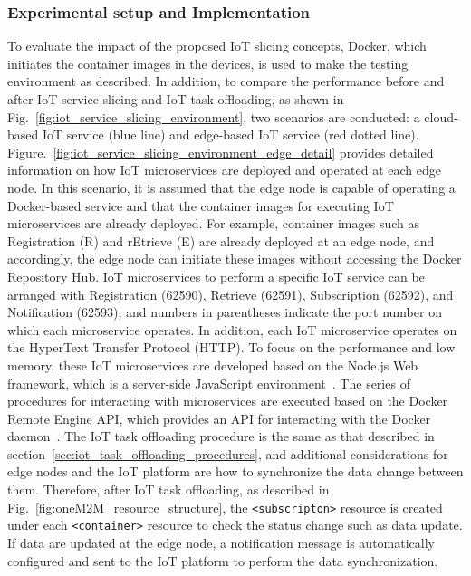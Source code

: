 \subsubsection{Experimental setup and Implementation}
To evaluate the impact of the proposed IoT slicing concepts, Docker, which initiates the container images in the devices, is used to make the testing environment as described. 
In addition, to compare the performance before and after IoT service slicing and IoT task offloading, as shown in Fig.~\ref{fig:iot_service_slicing_environment}, two scenarios are conducted: a cloud-based IoT service (blue line) and edge-based IoT service (red dotted line). 
Figure.~\ref{fig:iot_service_slicing_environment_edge_detail} provides detailed information on how IoT microservices are deployed and operated at each edge node. 
In this scenario, it is assumed that the edge node is capable of operating a Docker-based service and that the container images for executing IoT microservices are already deployed. 
For example, container images such as Registration (R) and rEtrieve (E) are already deployed at an edge node, and accordingly, the edge node can initiate these images without accessing the Docker Repository Hub. 
IoT microservices to perform a specific IoT service can be arranged with Registration (62590), Retrieve (62591), Subscription (62592), and Notification (62593), and numbers in parentheses indicate the port number on which each microservice operates. 
In addition, each IoT microservice operates on the HyperText Transfer Protocol (HTTP). 
To focus on the performance and low memory, these IoT microservices are developed based on the Node.js Web framework, which is a server-side JavaScript environment~\cite {tilkov2010node}. 
The series of procedures for interacting with microservices are executed based on the Docker Remote Engine API, which provides an API for interacting with the Docker daemon~\cite {DockerEngineAPI}. 
The IoT task offloading procedure is the same as that described in section~\ref{sec:iot_task_offloading_procedures}, and additional considerations for edge nodes and the IoT platform are how to synchronize the data change between them. Therefore, after IoT task offloading, 
as described in Fig.~\ref{fig:oneM2M_resource_structure}, the \texttt{<subscripton>} resource is created under each \texttt{<container>} resource to check the status change such as data update.
If data are updated at the edge node, a notification message is automatically configured and sent to the IoT platform to perform the data synchronization.


